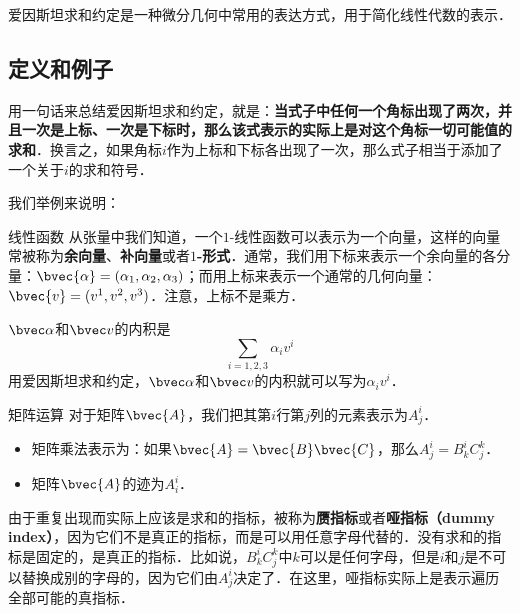 
\begin{issues}
\issueTODO
{}
\end{issues}



爱因斯坦求和约定是一种微分几何中常用的表达方式，用于简化线性代数的表示．

\subsection{定义和例子}

用一句话来总结爱因斯坦求和约定，就是：\textbf{当式子中任何一个角标出现了两次，并且一次是上标、一次是下标时，那么该式表示的实际上是对这个角标一切可能值的求和}．换言之，如果角标$i$作为上标和下标各出现了一次，那么式子相当于添加了一个关于$i$的求和符号．

我们举例来说明：

\begin{example}{线性函数}
从张量中我们知道，一个$1$-线性函数可以表示为一个向量，这样的向量常被称为\textbf{余向量}、\textbf{补向量}或者\textbf{$1$-形式}．通常，我们用下标来表示一个余向量的各分量：$\bvec{\alpha}=(\alpha_1, \alpha_2, \alpha_3)$；而用上标来表示一个通常的几何向量：$\bvec{v}=(v^1, v^2, v^3)$．注意，上标不是乘方．

$\bvec\alpha$和$\bvec v$的内积是$$\sum\limits_{i=1, 2, 3}\alpha_i v^i$$
用爱因斯坦求和约定，$\bvec\alpha$和$\bvec v$的内积就可以写为$\alpha_i v^i$．
\end{example}

\begin{example}{矩阵运算}
对于矩阵$\bvec{A}$，我们把其第$i$行第$j$列的元素表示为$A^i_j$．
\begin{itemize}
\item 矩阵乘法表示为：如果$\bvec{A}=\bvec{B}\bvec{C}$，那么$A^i_j=B^i_k C^k_j$．
\item 矩阵$\bvec{A}$的迹为$A^i_i$．

\end{itemize}
\end{example}

由于重复出现而实际上应该是求和的指标，被称为\textbf{赝指标}或者\textbf{哑指标（dummy index）}，因为它们不是真正的指标，而是可以用任意字母代替的．没有求和的指标是固定的，是真正的指标．比如说，$B^i_k C^k_j$中$k$可以是任何字母，但是$i$和$j$是不可以替换成别的字母的，因为它们由$A^i_j$决定了．在这里，哑指标实际上是表示遍历全部可能的真指标．

